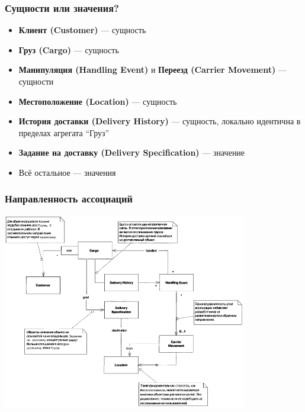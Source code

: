 \documentclass[xetex,mathserif,serif]{beamer}
\begin{document}
	\begin{frame}
		\frametitle{Сущности или значения?}
		\begin{itemize}
			\item \textbf{Клиент (Customer)} --- сущность
			\item \textbf{Груз (Cargo)} --- сущность
			\item \textbf{Манипуляция (Handling Event)} и \textbf{Переезд (Carrier Movement)} --- сущности
			\item \textbf{Местоположение (Location)} --- сущность
			\item \textbf{История доставки (Delivery History)} --- сущность, локально идентична в пределах агрегата ``Груз''
			\item \textbf{Задание на доставку (Delivery Specification)} --- значение
			\item Всё остальное --- значения
		\end{itemize}
	\end{frame}

	\begin{frame}
		\frametitle{Направленность ассоциаций}
		\begin{center}
			\includegraphics[width=0.8\textwidth]{cargoAssociations.png}
		\end{center}
	\end{frame}
\end{document}
